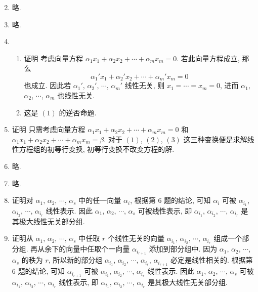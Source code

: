 \begin{enumerate}
\[        \]
    \item %
        略.
    \item %
        略.
    \item %
        \begin{enumerate}[(1)]
            \item %
                {\heiti 证明} 考虑向量方程 $\alpha_1x_1 + \alpha_2x_2 + \cdots + \alpha_mx_m = 0$. 若此向量方程成立, 那么
                \[
                    \alpha_1'x_1 + \alpha_2'x_2 + \cdots + \alpha_m'x_m = 0    
                \] 也成立. 因此若 $\alpha_1'$, $\alpha_2'$, $\cdots$, $\alpha_m'$ 线性无关, 则 $x_1 = \cdots = x_m = 0$,
                进而 $\alpha_1$, $\alpha_2$, $\cdots$, $\alpha_m$ 也线性无关.
            \item %
                这是 $(1)$ 的逆否命题.
        \end{enumerate}
    \item %
        {\heiti 证明} 只需考虑向量方程 $\alpha_1x_1 + \alpha_2x_2 + \cdots + \alpha_mx_m = 0$ 和 $\alpha_1x_1 + \alpha_2x_2 + \cdots + \alpha_mx_m = \beta$. 对于 $(1)$, $(2)$, $(3)$ 这三种变换便是求解线性方程组的初等行变换,
        初等行变换不改变方程的解.
    \item %
        略.
    \item %
        略.
    \item %
        {\heiti 证明}\quad 对 $\alpha_1$, $\alpha_2$, $\cdots$, $\alpha_s$ 中的任一向量 $\alpha_i$, 根据{\heiti 第 6 题}的结论, 可知 $\alpha_i$ 可被 $\alpha_{i_1}$, $\alpha_{i_2}$, $\cdots$, $\alpha_{i_r}$ 线性表示.
        因此 $\alpha_1$, $\alpha_2$, $\cdots$, $\alpha_s$ 可被线性表示, 即 $\alpha_{i_1}$, $\alpha_{i_2}$, $\cdots$, $\alpha_{i_r}$ 是其极大线性无关部分组.
    \item %
        {\heiti 证明}\quad 从 $\alpha_1$, $\alpha_2$, $\cdots$, $\alpha_s$ 中任取 $r$ 个线性无关的向量 $\alpha_{i_1}$, $\alpha_{i_2}$, $\cdots$, $\alpha_{i_r}$ 组成一个部分组.
        再从余下的向量中任取个一向量 $\alpha_{i_{r+1}}$ 添加到部分组中. 因为 $\alpha_1$, $\alpha_2$, $\cdots$, $\alpha_s$ 的秩为 $r$, 所以新的部分组 $\alpha_{i_1}$, $\alpha_{i_2}$, $\cdots$, $\alpha_{i_r}$, $\alpha_{i_{r+1}}$ 必定是线性相关的.
        根据{\heiti 第 6 题}的结论, 可知 $\alpha_{i_{r+1}}$ 可被 $\alpha_{i_1}$, $\alpha_{i_2}$, $\cdots$, $\alpha_{i_r}$ 线性表示.
        因此 $\alpha_1$, $\alpha_2$, $\cdots$, $\alpha_s$ 可被 $\alpha_{i_1}$, $\alpha_{i_2}$, $\cdots$, $\alpha_{i_r}$ 线性表示, 即 $\alpha_{i_1}$, $\alpha_{i_2}$, $\cdots$, $\alpha_{i_r}$ 是其极大线性无关部分组.

\end{enumerate}
